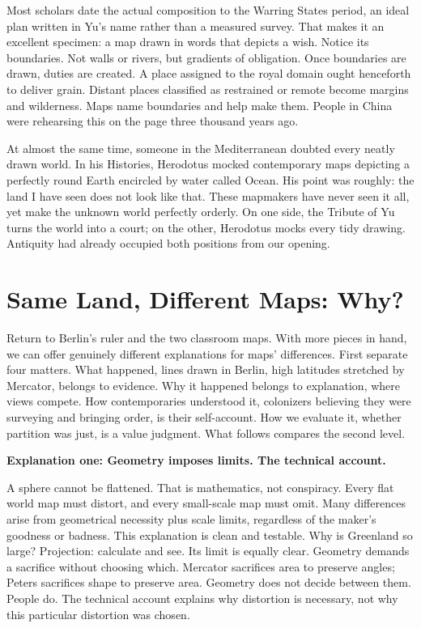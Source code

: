 Most scholars date the actual composition to the Warring States period, an ideal plan written in Yu's name rather than a measured survey. That makes it an excellent specimen: a map drawn in words that depicts a wish. Notice its boundaries. Not walls or rivers, but gradients of obligation. Once boundaries are drawn, duties are created. A place assigned to the royal domain ought henceforth to deliver grain. Distant places classified as restrained or remote become margins and wilderness. Maps name boundaries and help make them. People in China were rehearsing this on the page three thousand years ago.

At almost the same time, someone in the Mediterranean doubted every neatly drawn world. In his Histories, Herodotus mocked contemporary maps depicting a perfectly round Earth encircled by water called Ocean. His point was roughly: the land I have seen does not look like that. These mapmakers have never seen it all, yet make the unknown world perfectly orderly. On one side, the Tribute of Yu turns the world into a court; on the other, Herodotus mocks every tidy drawing. Antiquity had already occupied both positions from our opening.

\section{Same Land, Different Maps: Why?}
Return to Berlin's ruler and the two classroom maps. With more pieces in hand, we can offer genuinely different explanations for maps' differences. First separate four matters. What happened, lines drawn in Berlin, high latitudes stretched by Mercator, belongs to evidence. Why it happened belongs to explanation, where views compete. How contemporaries understood it, colonizers believing they were surveying and bringing order, is their self-account. How we evaluate it, whether partition was just, is a value judgment. What follows compares the second level.

\textbf{Explanation one: Geometry imposes limits. The technical account.}

A sphere cannot be flattened. That is mathematics, not conspiracy. Every flat world map must distort, and every small-scale map must omit. Many differences arise from geometrical necessity plus scale limits, regardless of the maker's goodness or badness. This explanation is clean and testable. Why is Greenland so large? Projection: calculate and see. Its limit is equally clear. Geometry demands a sacrifice without choosing which. Mercator sacrifices area to preserve angles; Peters sacrifices shape to preserve area. Geometry does not decide between them. People do. The technical account explains why distortion is necessary, not why this particular distortion was chosen.

